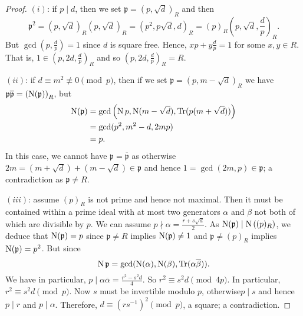 \begin{proof}
	$(i)$: if $p \mid d$, then we set $\mathfrak p = (p, \sqrt d)_R$
	and then
	\[
		\mathfrak p^2
		= (p, \sqrt d)_R (p, \sqrt d)_R
		= (p^2, p\sqrt d, d)_R
		= (p)_R \left( p, \sqrt d, \frac dp \right)_R.
	\]
	But $\gcd\left( p, \frac dp \right) = 1$ since $d$ is square free.
	Hence,
	$xp + y\frac dp = 1$ for some $x, y \in R$.
	That is, $1 \in \left( p, 2d, \frac dp \right)_R$
	and so $\left( p, 2d, \frac dp \right)_R = R$.

	$(ii)$: if $d \equiv m^2 \not\equiv 0 \pmod p$,
	then if we set
	$\mathfrak p = (p, m - \sqrt d)_R$ we have
	$\mathfrak p \overline{\mathfrak p} = \left( \operatorname{N}(\mathfrak p) \right)_R$,
	but
	\begin{align*}
		\operatorname{N}(\mathfrak p)
		&= \gcd\left( 
			\operatorname{N}{p},
			\operatorname{N}(m - \sqrt d),
			\operatorname{Tr}(p(m + \sqrt d))
		 \right) \\
		 &= \gcd(p^2, m^2 - d, 2mp) \\
		 &= p.
	\end{align*}
	In this case, we cannot have $\mathfrak p = \overline{\mathfrak p}$
	as otherwise $2m = (m + \sqrt d) + (m - \sqrt d) \in \mathfrak p$
	and hence $1 = \gcd(2m, p) \in \mathfrak p$; a contradiction as
	$\mathfrak p \neq R$.

	$(iii)$: assume $(p)_R$ is not prime and hence not maximal.
	Then it must be contained within a prime ideal with at most two generators
	$\alpha$ and $\beta$ not both of which are divisible by $p$.
	We can assume $p \nmid \alpha = \frac{r + s\sqrt d}2$.
	As $\operatorname{N}(\mathfrak p) \mid \operatorname{N}\left( (p)_R \right)$,
	we deduce that $\operatorname{N}(\mathfrak p) = p$ since $\mathfrak p \neq R$ implies
	$\operatorname{N}(\mathfrak p) \neq 1$
	and $\mathfrak p \neq (p)_R$ implies $\operatorname{N}(\mathfrak p) = p^2$.
	But since
	\[
		\operatorname{N}{\mathfrak p}
		= \gcd(\operatorname{N}(\alpha), \operatorname{N}(\beta), \operatorname{Tr}(\alpha \overline\beta)).
	\]
	We have in particular, 
	$p \mid \alpha \overline\alpha = \frac{r^2 - s^2d}4$.
	So $r^2 \equiv s^2d \pmod{4p}$.
	In particular, $r^2 \equiv s^2d \pmod p$.
	Now $s$ must be invertible modulo $p$, otherwise$p \mid s$ and hence
	$p \mid r$ and $p \mid \alpha$.
	Therefore,
	$d \equiv \left( rs^{-1} \right)^2 \pmod p$, a square;
	a contradiction.
\end{proof}

